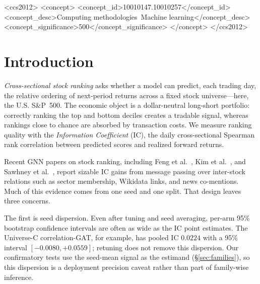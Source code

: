 \documentclass[sigconf,nonacm]{acmart}
\begin{document}
\begin{CCSXML}
<ccs2012>
<concept>
<concept_id>10010147.10010257</concept_id>
<concept_desc>Computing methodologies~Machine learning</concept_desc>
<concept_significance>500</concept_significance>
</concept>
</ccs2012>
\end{CCSXML}


\maketitle

\section{Introduction}\label{sec:intro}

\emph{Cross-sectional stock ranking} asks whether a model can predict, each trading day, the relative ordering of next-period returns across a fixed stock universe---here, the U.S. S\&P~500. The economic object is a dollar-neutral long-short portfolio: correctly ranking the top and bottom deciles creates a tradable signal, whereas rankings close to chance are absorbed by transaction costs. We measure ranking quality with the \emph{Information Coefficient} (IC), the daily cross-sectional Spearman rank correlation between predicted scores and realized forward returns.

Recent GNN papers on stock ranking, including Feng et al.~\cite{feng2019temporal}, Kim et al.~\cite{kim2019hats}, and Sawhney et al.~\cite{sawhney2021sthansr}, report sizable IC gains from message passing over inter-stock relations such as sector membership, Wikidata links, and news co-mentions. Much of this evidence comes from one seed and one split. That design leaves three concerns.

The first is seed dispersion. Even after tuning and seed averaging, per-arm 95\% bootstrap confidence intervals are often as wide as the IC point estimates. The Universe-C correlation-GAT, for example, has pooled IC $0.0224$ with a 95\% interval $[-0.0080,+0.0559]$; retuning does not remove this dispersion. Our confirmatory tests use the seed-mean signal as the estimand (\S\ref{sec:families}), so this dispersion is a deployment precision caveat rather than part of family-wise inference.
\end{document}
